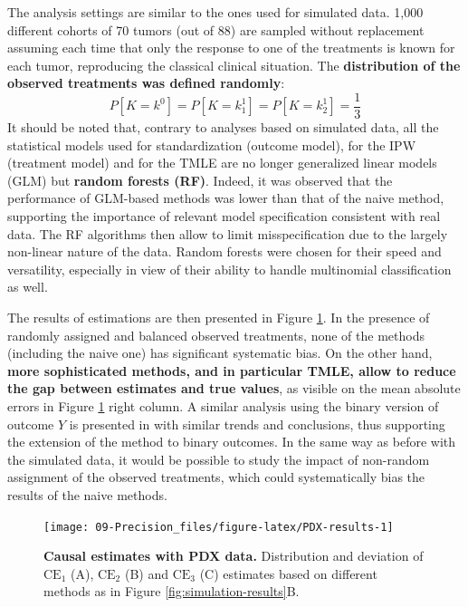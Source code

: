 \documentclass[a4paper,12pt,twoside,onecolumn,openright,final,oldfontcommands]{memoir}
\begin{document}
The analysis settings are similar to the ones used for simulated data.
1,000 different cohorts of 70 tumors (out of 88) are sampled without
replacement assuming each time that only the response to one of the
treatments is known for each tumor, reproducing the classical clinical
situation. The \textbf{distribution of the observed treatments was
defined randomly}: \[P[K=k^0]=P[K=k^1_1]=P[K=k^1_2]=\dfrac{1}{3}\] It
should be noted that, contrary to analyses based on simulated data, all
the statistical models used for standardization (outcome model), for the
IPW (treatment model) and for the TMLE are no longer generalized linear
models (GLM) but \textbf{random forests (RF)}. Indeed, it was observed
that the performance of GLM-based methods was lower than that of the
naive method, supporting the importance of relevant model specification
consistent with real data. The RF algorithms then allow to limit
misspecification due to the largely non-linear nature of the data.
Random forests were chosen for their speed and versatility, especially
in view of their ability to handle multinomial classification as well.

The results of estimations are then presented in Figure
\ref{fig:PDX-results}. In the presence of randomly assigned and balanced
observed treatments, none of the methods (including the naive one) has
significant systematic bias. On the other hand, \textbf{more
sophisticated methods, and in particular TMLE, allow to reduce the gap
between estimates and true values}, as visible on the mean absolute
errors in Figure \ref{fig:PDX-results} right column. A similar analysis
using the binary version of outcome \(Y\) is presented in
\citet{beal2020causal} with similar trends and conclusions, thus
supporting the extension of the method to binary outcomes. In the same
way as before with the simulated data, it would be possible to study the
impact of non-random assignment of the observed treatments, which could
systematically bias the results of the naive methods.

\begin{figure}

{\centering \texttt{[image: 09-Precision\_files/figure-latex/PDX-results-1]} 

}

\caption[Causal estimates with PDX data]{\textbf{Causal estimates with PDX data.}
Distribution and deviation of \(\text{CE}_1\) (A), \(\text{CE}_2\) (B)
and \(\text{CE}_3\) (C) estimates based on different methods as in
Figure \ref{fig:simulation-results}B.}\label{fig:PDX-results}
\end{figure}
\end{document}
